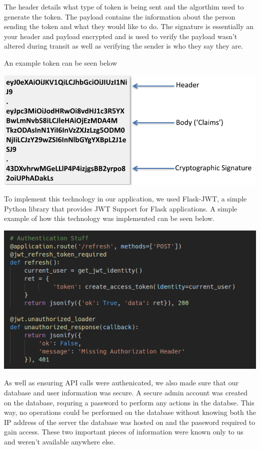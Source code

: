     The header details what type of token is being sent and the algorthim used to generate the token.
    The payload contains the information about the person sending the token and what they would like to do.
    The signature is essentially an your header and payload encrypted and is used to verify the payload wasn't altered during transit as well as verifying the sender is who they say they are.
    
    An example token can be seen below

    \begin{center}    
      \includegraphics{img/JWTTokenHASH.png}
    \end{center}

    To implement this technology in our application, we used Flask-JWT, a simple Python library that provides JWT Support for Flask applications.
    A simple example of how this technology was implemented can be seen below.

    \begin{center}    
      \includegraphics{img/JWTExample.png}
    \end{center}

    As well as ensuring API calls were authenicated, we also made sure that our database and user information was secure. A secure admin account was created on the database, requring a password to perform any actions in the databse.
    This way, no operations could be performed on the database without knowing both the IP address of the server the database was hosted on and the password required to gain access. These two important pieces of information were known only to us and 
    weren't available anywhere else. 

